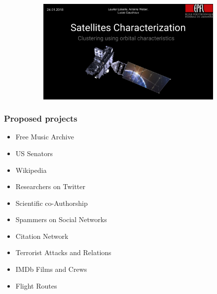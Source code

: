 \documentclass[aspectratio=169]{beamer}
\begin{document}
\begin{frame}
\begin{figure}
\begin{subfigure}[b]{0.47\linewidth}
		\end{subfigure}
		\hfill
		\begin{subfigure}[b]{0.47\linewidth}
			\includegraphics[width=\linewidth]{project2017_satellites}
		\end{subfigure}
	\end{figure}
\end{frame}


\begin{frame}
	\frametitle{Proposed projects}
	\begin{itemize}
		\item Free Music Archive
		\vfill
		\item US Senators
		\vfill
		\item Wikipedia
		\vfill
		\item Researchers on Twitter
		\vfill
		\item Scientific co-Authorship
		\vfill
		\item Spammers on Social Networks
		\vfill
		\item Citation Network
		\vfill
		\item Terrorist Attacks and Relations
		\vfill
		\item IMDb Films and Crews
		\vfill
		\item Flight Routes
	\end{itemize}
\end{frame}

\end{document}
